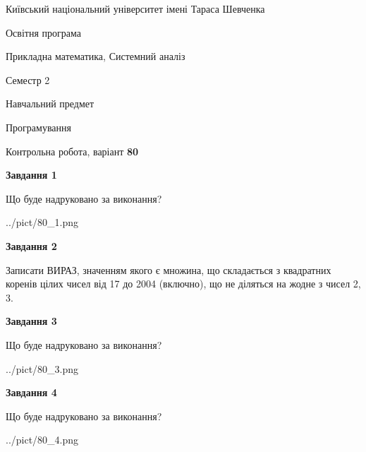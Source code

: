 \documentclass[12pt, ukrainian]{article}
\begin{document}
{{\begin {small}\par
{ \center  Київський національний університет імені Тараса Шевченка \par}
{\parbox {5 cm}{Освітня програма \hfill}{\parbox {8 cm}{Прикладна математика, Системний аналіз \hfill}}\parbox {5 cm}{\hfill Семестр 2}}\par
{\parbox {5 cm} {Навчальний предмет \hfill}\parbox {7 cm}{Програмування \hfill}\parbox {6cm}{\hfill}\par}\vspace{-7pt} \end{small}}{\center Контрольна робота, варіант  \No \textbf
{ 80 }\par}}
{
\begin {large}
{\begin {center}\textbf{Завдання 1}\end {center}}\par
Що буде надруковано за виконання?\par\par
\begin{center}
	{../pict/80_1.png}
\end{center}
\newpage

{\begin {center}\textbf{Завдання 2}\end {center}}\par
Записати ВИРАЗ, значенням якого є множина, що складається з квадратних корен\-ів цілих чисел від 17 до 2004 (включно), що не діляться на жодне з чисел 2, 3.\par
\newpage

{\begin {center}\textbf{Завдання 3}\end {center}}\par
Що буде надруковано за виконання?\par
\begin{center}
	{../pict/80_3.png}
\end{center}
\newpage

{\begin {center}\textbf{Завдання 4}\end {center}}\par
Що буде надруковано за виконання?\par
\begin{center}
	{../pict/80_4.png}
\end{center}
\newpage


\end{large}}
\end{document}
